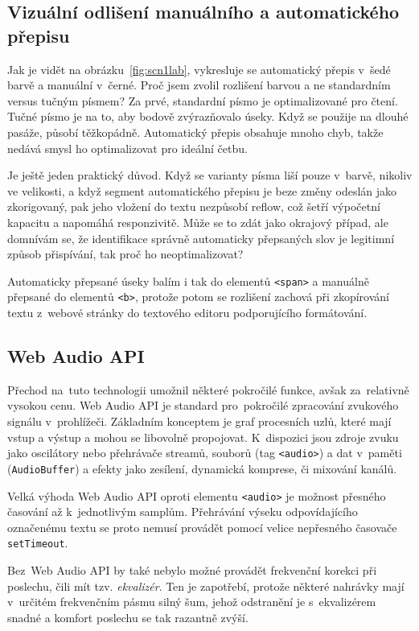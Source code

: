 \subsection{Vizuální odlišení manuálního a automatického přepisu}

Jak je vidět na obrázku~\ref{fig:scn1lab}, vykresluje se automatický přepis
v~šedé barvě a manuální v~černé. Proč jsem zvolil rozlišení barvou a ne standardním
versus tučným písmem? Za prvé, standardní písmo je optimalizované pro čtení.
Tučné písmo je na to, aby bodově zvýrazňovalo úseky. Když se použije na dlouhé
pasáže, působí těžkopádně. Automatický přepis obsahuje mnoho chyb, takže nedává
smysl ho optimalizovat pro ideální četbu.

Je ještě jeden praktický důvod. Když se varianty písma liší pouze v~barvě,
nikoliv ve velikosti, a když segment automatického přepisu je beze změny odeslán
jako zkorigovaný, pak jeho vložení do textu nezpůsobí reflow, což šetří
výpočetní kapacitu a napomáhá responzivitě. Může se to zdát jako okrajový
případ, ale domnívám se, že identifikace správně automaticky přepsaných slov je
legitimní způsob přispívání, tak proč ho neoptimalizovat?

Automaticky přepsané úseky balím i tak do elementů
\texttt{<span>} a manuálně přepsané do elementů \texttt{<b>}, protože potom se
rozlišení zachová při zkopírování textu z~webové stránky do textového editoru
podporujícího formátování.

\subsection{Web Audio API}

Přechod na~tuto technologii umožnil některé pokročilé funkce, avšak za~relativně
vysokou cenu. Web Audio API je standard pro~pokročilé zpracování zvukového
signálu v~prohlížeči. Základním konceptem je graf procesních uzlů, které mají
vstup a výstup a mohou se libovolně propojovat. K~dispozici jsou zdroje zvuku
jako oscilátory nebo přehrávače streamů, souborů (tag \texttt{<audio>}) a dat
v~paměti (\texttt{AudioBuffer}) a efekty jako zesílení, dynamická komprese, či
mixování kanálů.

Velká výhoda Web Audio API oproti elementu \texttt{<audio>} je možnost přesného
časování až k~jednotlivým samplům. Přehrávání výseku odpovídajícího označenému
textu se proto nemusí provádět pomocí velice nepřesného časovače
\texttt{setTimeout}.

Bez~Web Audio API by také nebylo možné provádět frekvenční korekci při poslechu,
čili mít tzv. \textit{ekvalizér}. Ten je zapotřebí, protože některé nahrávky
mají v~určitém frekvenčním pásmu silný šum, jehož odstranění je s~ekvalizérem
snadné a komfort poslechu se tak razantně zvýší.

